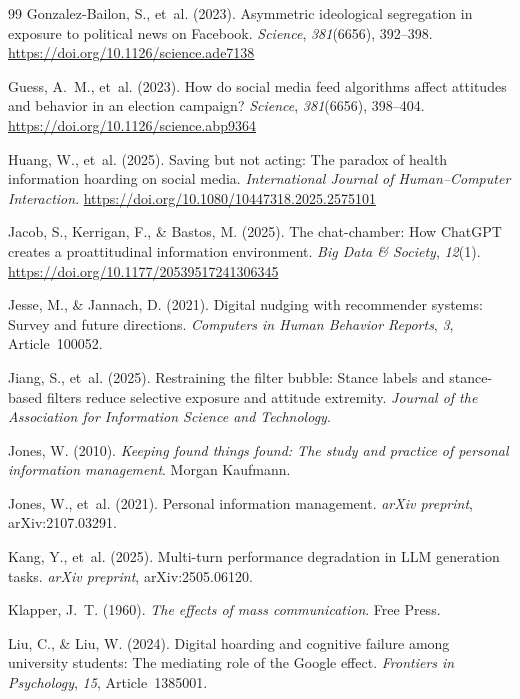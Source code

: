\documentclass[12pt,a4paper]{article}
\begin{document}
\begin{thebibliography}{99}
Gonzalez-Bailon, S., et~al. (2023).
Asymmetric ideological segregation in exposure to political news on Facebook.
\emph{Science}, \emph{381}(6656), 392--398.
\url{https://doi.org/10.1126/science.ade7138}

Guess, A.~M., et~al. (2023).
How do social media feed algorithms affect attitudes and behavior in an election campaign?
\emph{Science}, \emph{381}(6656), 398--404.
\url{https://doi.org/10.1126/science.abp9364}

Huang, W., et~al. (2025).
Saving but not acting: The paradox of health information hoarding on social media.
\emph{International Journal of Human--Computer Interaction}.
\url{https://doi.org/10.1080/10447318.2025.2575101}

Jacob, S., Kerrigan, F., \& Bastos, M. (2025).
The chat-chamber: How ChatGPT creates a proattitudinal information environment.
\emph{Big Data \& Society}, \emph{12}(1).
\url{https://doi.org/10.1177/20539517241306345}

Jesse, M., \& Jannach, D. (2021).
Digital nudging with recommender systems: Survey and future directions.
\emph{Computers in Human Behavior Reports}, \emph{3}, Article~100052.

Jiang, S., et~al. (2025).
Restraining the filter bubble: Stance labels and stance-based filters reduce selective exposure and attitude extremity.
\emph{Journal of the Association for Information Science and Technology}.

Jones, W. (2010).
\emph{Keeping found things found: The study and practice of personal information management}.
Morgan Kaufmann.

Jones, W., et~al. (2021).
Personal information management.
\emph{arXiv preprint}, arXiv:2107.03291.

Kang, Y., et~al. (2025).
Multi-turn performance degradation in LLM generation tasks.
\emph{arXiv preprint}, arXiv:2505.06120.

Klapper, J.~T. (1960).
\emph{The effects of mass communication}.
Free Press.

Liu, C., \& Liu, W. (2024).
Digital hoarding and cognitive failure among university students: The mediating role of the Google effect.
\emph{Frontiers in Psychology}, \emph{15}, Article~1385001.


\end{thebibliography}
\end{document}
